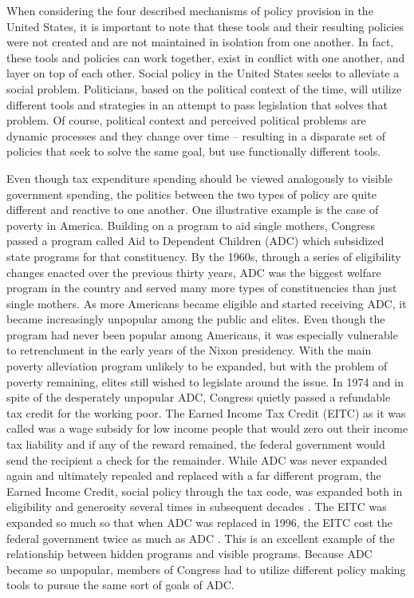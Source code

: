 \documentclass[12pt]{article}
\begin{document}
When considering the four described mechanisms of policy provision in the United States, it is important to note that these tools and their resulting policies were not created and are not maintained in isolation from one another. In fact, these tools and policies can work together, exist in conflict with one another, and layer on top of each other. Social policy in the United States seeks to alleviate a social problem. Politicians, based on the political context of the time, will utilize different tools and strategies in an attempt to pass legislation that solves that problem. Of course, political context and perceived political problems are dynamic processes and they change over time -- resulting in a disparate set of policies that seek to solve the same goal, but use functionally different tools.

Even though tax expenditure spending should be viewed analogously to visible government spending, the politics between the two types of policy are quite different and reactive to one another. One illustrative example is the case of poverty in America. Building on a program to aid single mothers, Congress passed a program called Aid to Dependent Children (ADC) which subsidized state programs for that constituency. By the 1960s, through a series of eligibility changes enacted over the previous thirty years, ADC was the biggest welfare program in the country and served many more types of constituencies than just single mothers. As more Americans became eligible and started receiving ADC, it became increasingly unpopular among the public and elites. Even though the program had never been popular among Americans, it was especially vulnerable to retrenchment in the early years of the Nixon presidency. With the main poverty alleviation program unlikely to be expanded, but with the problem of poverty remaining, elites still wished to legislate around the issue. In 1974 and in spite of the desperately unpopular ADC, Congress quietly passed a refundable tax credit for the working poor. The Earned Income Tax Credit (EITC) as it was called was a wage subsidy for low income people that would zero out their income tax liability and if any of the reward remained, the federal government would send the recipient a check for the remainder. While ADC was never expanded again and ultimately repealed and replaced with a far different program, the Earned Income Credit, social policy through the tax code, was expanded both in eligibility and generosity several times in subsequent decades \citep{stewart1991}. The EITC was expanded so much so that when ADC was replaced in 1996, the EITC cost the federal government twice as much as ADC \citep{myles1997}. This is an excellent example of the relationship between hidden programs and visible programs. Because ADC became so unpopular, members of Congress had to utilize different policy making tools to pursue the same sort of goals of ADC.
\end{document}
